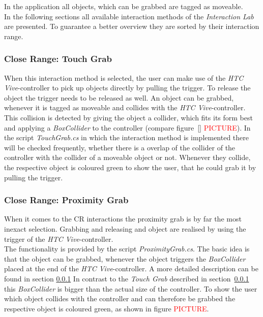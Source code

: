 In the application all objects, which can be grabbed are tagged as moveable.\\

In the following sections all available interaction methods of the \textit{Interaction Lab} are presented. To guarantee a better overview they are sorted by their interaction range. 

\subsubsection{Close Range: Touch Grab} \label{sec:TouchGrab}
When this interaction method is selected, the user can make use of the \textit{HTC Vive}-controller to pick up objects directly by pulling the trigger. To release the object the trigger needs to be released as well. An object can be grabbed, whenever it is tagged as moveable and collides with the \textit{HTC Vive}-controller. This collision is detected by giving the object a collider, which fits its form best \cite{website:BoxCollider}\cite{website:SphereCollider} and applying a \textit{BoxCollider} to the controller (compare figure~\ref{} \textcolor{red}{PICTURE}). In the script \textit{TouchGrab.cs} in which the interaction method is implemented there will be checked frequently, whether there is a overlap of the collider of the controller with the collider of a moveable object or not. Whenever they collide, the respective object is coloured green to show the user, that he could grab it by pulling the trigger. 

\subsubsection{Close Range: Proximity Grab} \label{sec:ProximityGrab}
When it comes to the CR interactions the proximity grab is by far the most inexact selection. Grabbing and releasing and object are realised by using the trigger of the \textit{HTC Vive}-controller.  \\
The functionality is provided by the script \textit{ProximityGrab.cs}. The basic idea is that the object can be grabbed, whenever the object triggers the \textit{BoxCollider} \cite{website:BoxCollider} placed at the end of the \textit{HTC Vive}-controller. A more detailed description can be found in section \ref{sec:TouchGrab} In contrast to the \textit{Touch Grab} described in section~\ref{sec:TouchGrab} this \textit{BoxCollider} is bigger than the actual size of the controller. To show the user which object collides with the controller and can therefore be grabbed the respective object is coloured green, as shown in figure \textcolor{red}{PICTURE}. 


